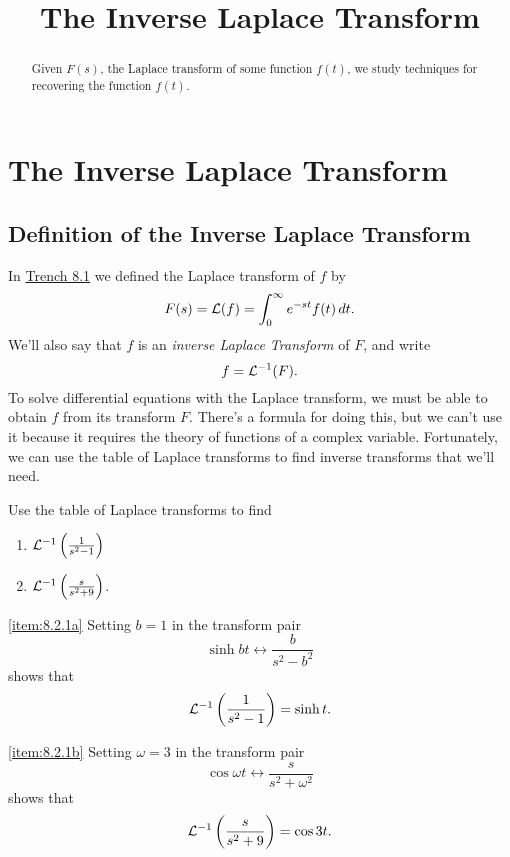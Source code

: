 \documentclass{ximera}
\title{The Inverse Laplace Transform}%
\begin{document}
\begin{abstract}
Given $F(s)$, the Laplace transform of some function $f(t)$, we study techniques for recovering the function $f(t)$.
\end{abstract}

\maketitle

\section*{The Inverse Laplace Transform}

\subsection*{Definition of the Inverse Laplace Transform}

In \href{https://ximera.osu.edu/ode/main/introToLaplace/introToLaplace}{Trench 8.1} we defined the Laplace transform
of
$f$ by
$$
F(s)={\cal L}(f)=\int_0^\infty e^{-st}f(t)\,dt.
$$
We'll also say that $f$ is an \textit{inverse Laplace Transform} of
$F$, and write
$$
f={\cal L}^{-1}(F).
$$
To solve differential equations with the Laplace transform, we
must be able to obtain $f$ from its transform $F$. There's a formula
for doing this, but we can't use it because it requires the theory of
functions of a complex variable. Fortunately, we can use the table of
Laplace transforms to find inverse transforms that we'll need.

\begin{example}\label{example:8.2.1}
Use the table of Laplace transforms to find
\begin{enumerate}
    
    \item\label{item:8.2.1a} ${\cal L}^{-1}\left(\frac{1}{s^2-1}\right)$
    \item\label{item:8.2.1b} ${\cal L}^{-1}\left(\frac{s}{s^2+9}\right)$. 
\end{enumerate}
\begin{explanation}
\ref{item:8.2.1a}
Setting $b=1$ in  the transform pair
$$
\sinh bt\leftrightarrow \frac{b}{s^2-b^2}
$$
shows that
$$
{\cal L}^{-1}\left(\frac{1}{s^2-1}\right)=\sinh t.
$$

\ref{item:8.2.1b}
Setting $\omega=3$ in  the transform pair
$$
\cos\omega t\leftrightarrow\frac{s}{s^2+\omega^2}
$$
shows that
$$
{\cal L}^{-1}\left(\frac{s}{s^2+9}\right)=\cos3t.
$$
\end{explanation}
\end{example}
\end{document}
